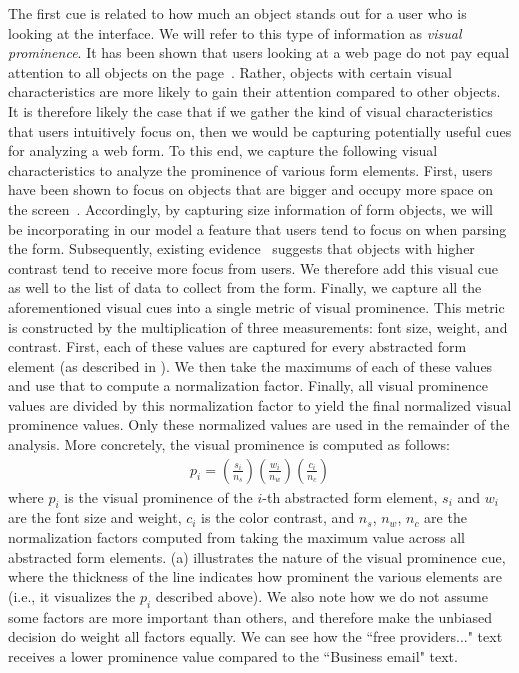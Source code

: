 The first cue is related to how much an object stands out for a user who is looking at the interface. 
We will refer to this type of information as \emph{visual prominence}. 
It has been shown that users looking at a web page do not pay equal attention 
to all objects on the page~\cite{eraslan2016eye,shen2014webpage}. 
Rather, objects with certain visual characteristics are more likely to gain 
their attention compared to other objects. 
It is therefore likely the case that if we gather the kind of visual characteristics 
that users intuitively focus on, then we would be capturing potentially useful 
cues for analyzing a web form. 
To this end, we capture the following visual characteristics to analyze the 
prominence of various form elements. First, users have been shown to focus on 
objects that are bigger and occupy more space on the screen~\cite{buscher2009you}. 
Accordingly, by capturing size information of form objects, we will be incorporating 
in our model a feature that users tend to focus on when parsing the form. 
Subsequently, existing evidence~\cite{gupta2018saliency} suggests that objects 
with higher contrast tend to receive more focus from users. We therefore add 
this visual cue as well to the list of data to collect from the form. 
Finally, we capture all the aforementioned visual cues into a single metric of 
visual prominence. This metric is constructed by the multiplication of three 
measurements: font size, weight, and contrast. First, each of these values 
are captured for every abstracted form element (as described in 
). We then take the maximums 
of each of these values and use that to compute a normalization 
factor. Finally, all visual prominence values are divided by this 
normalization factor to yield the final normalized visual prominence 
values. Only these normalized values are used in the remainder of 
the analysis. More concretely, the visual prominence 
is computed as follows:
\begin{eqnarray}
	p_i =  \left( \frac{s_i}{n_s} \right)  \left( \frac{w_i}{n_w} \right) \left( \frac{c_i}{n_c} \right)
\end{eqnarray}
where $p_i$ is the visual prominence of the $i$-th abstracted form element, 
$s_i$ and $w_i$ are the font size and weight, $c_i$ is the color contrast,  
and $n_s$, $n_w$, $n_c$ are the normalization factors computed from taking 
the maximum value across all abstracted form elements. 
(a) illustrates the nature of the visual prominence cue, 
where the thickness of the line indicates how prominent the various elements are
(i.e., it visualizes the $p_i$ described above). 
We also note how we do not assume some factors are more important than others, and therefore make the unbiased decision do weight all factors equally. 
We can see how the ``free providers..." text receives a lower prominence value compared to the ``Business email" text. 
 
